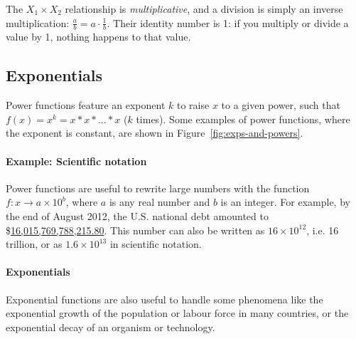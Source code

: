   The $X_1 \times X_2$ relationship is \emph{multiplicative}, and a division is simply an inverse multiplication: $\frac{a}{b} = a \cdot \frac{1}{b}$. Their identity number is 1: if you multiply or divide a value by 1, nothing happens to that value.%


%
%
\subsection{Exponentials}

Power functions feature an exponent $k$ to raise $x$ to a given power, such that $f(x) = x^k = x*x*...*x$ ($k$ times). Some examples of power functions, where the exponent is constant, are shown in Figure~\ref{fig:exps-and-powers}.%

%
\paragraph{Example: Scientific notation}%
%
Power functions are useful to rewrite large numbers with the function $f: x \to a \times 10^b$, where $a$ is any real number and $b$ is an integer. For example, by the end of August 2012, the U.S. national debt amounted to \$\href{http://www.treasurydirect.gov/NP/BPDLogin?application=np}{16,015,769,788,215.80}. This number can also be written as $16 \times 10^{12}$, i.e. 16 trillion, or as \ensuremath{1.6\times 10^{13}} in scientific notation.

%
\paragraph{Exponentials}

Exponential functions are also useful to handle some phenomena like the exponential growth of the population or labour force in many countries, or the exponential decay of an organism or technology.

